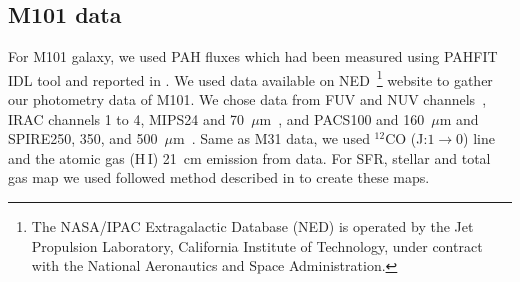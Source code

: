     \subsection{M101 data}
     For M101 galaxy, we used PAH fluxes which had been measured using {\tiny PAHFIT IDL} tool and reported in \cite{Gordon08}. 
     We used data available on NED~\footnote{The NASA/IPAC Extragalactic Database (NED) is operated by the Jet Propulsion Laboratory, California Institute of Technology, under contract with the National Aeronautics and Space Administration.} website to gather our photometry data of M101. 
     We chose data from \GALEX FUV and NUV channels~\citep{depaz07}, IRAC channels 1 to 4, MIPS24 and 70~$\mu$m~\cite{Dale09}, and  PACS100 and 160~$\mu$m and SPIRE250, 350, and 500~$\mu$m~\cite{Kennicutt11}.
     Same as M31 data, we used $^{12}$CO (J:$1\rightarrow0$) line~\citep{Helfer03} and the atomic gas (H\,{\sc I}) 21~cm emission from \cite{Walter08} data.
     For SFR, stellar and total gas map we used followed method described in \cite{Rahmani16} to create these maps.